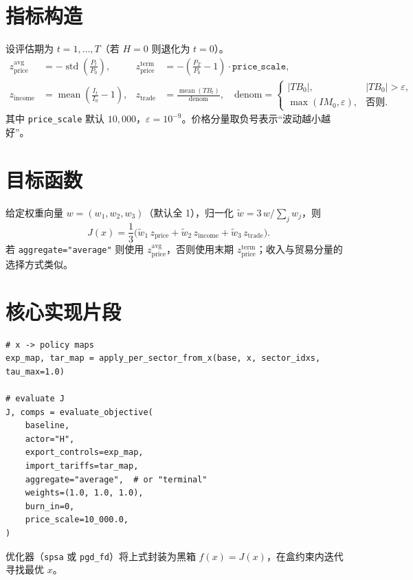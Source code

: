 \documentclass[11pt]{article}
\begin{document}
\section{指标构造}
设评估期为 $t=1,\dots,T$（若 $H=0$ 则退化为 $t=0$）。
\begin{align*}
    z_{\text{price}}^{\text{avg}} &= -\operatorname{std}\!\left(\frac{P_t}{P_0}\right), &
    z_{\text{price}}^{\text{term}} &= -\left(\frac{P_T}{P_0}-1\right)\cdot \texttt{price\_scale}, \\
    z_{\text{income}} &= \operatorname{mean}\!\left(\frac{I_t}{I_0}-1\right), &
    z_{\text{trade}} &= \frac{\operatorname{mean}(TB_t)}{\text{denom}},\quad
    \text{denom} = \begin{cases}
        |TB_0|, & |TB_0|> \varepsilon,\\
        \max(IM_0,\varepsilon), & \text{否则}.
    \end{cases}
\end{align*}
其中 \texttt{price\_scale} 默认 $10{,}000$，$\varepsilon=10^{-9}$。价格分量取负号表示“波动越小越好”。

\section{目标函数}
给定权重向量 $w=(w_1,w_2,w_3)$（默认全 1），归一化
$\tilde{w} = 3\,w / \sum_j w_j$，则
\[
    J(x) = \frac{1}{3}\Big(\tilde{w}_1\, z_{\text{price}} + \tilde{w}_2\, z_{\text{income}} + \tilde{w}_3\, z_{\text{trade}}\Big).
\]
若 \verb|aggregate="average"| 则使用 $z^{\text{avg}}_{\text{price}}$，否则使用末期 $z^{\text{term}}_{\text{price}}$；收入与贸易分量的选择方式类似。

\section{核心实现片段}
\begin{lstlisting}[basicstyle=\ttfamily\small]
# x -> policy maps
exp_map, tar_map = apply_per_sector_from_x(base, x, sector_idxs, tau_max=1.0)

# evaluate J
J, comps = evaluate_objective(
    baseline,
    actor="H",
    export_controls=exp_map,
    import_tariffs=tar_map,
    aggregate="average",  # or "terminal"
    weights=(1.0, 1.0, 1.0),
    burn_in=0,
    price_scale=10_000.0,
)
\end{lstlisting}
优化器（\verb|spsa| 或 \verb|pgd_fd|）将上式封装为黑箱 $f(x)=J(x)$，在盒约束内迭代寻找最优 $x$。
\end{document}
